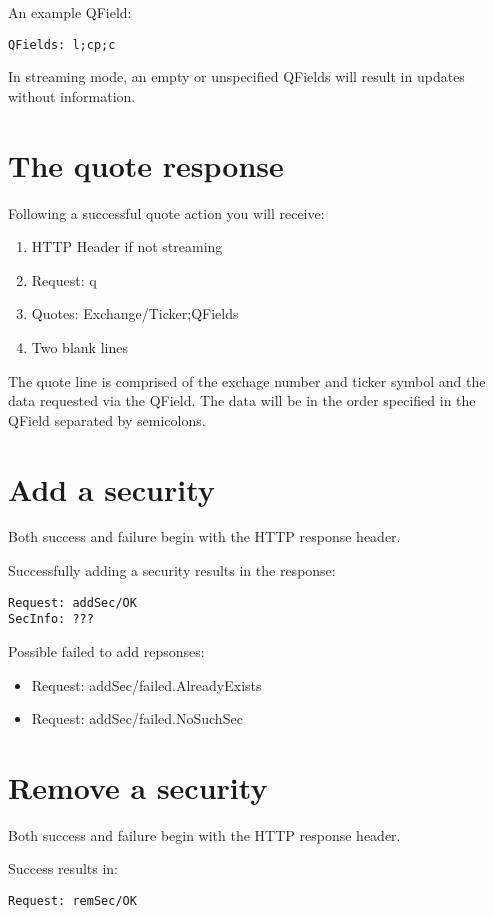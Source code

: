 \documentclass[12pt,twoside,letterpaper]{report}
\begin{document}
An example QField:
\begin{verbatim}
QFields: l;cp;c
\end{verbatim}

In streaming mode, an empty or unspecified QFields will result in updates without information.

\section*{The quote response}
Following a successful quote action you will receive:

\begin{enumerate}
\item HTTP Header if not streaming
\item Request: q
\item Quotes: Exchange/Ticker;QFields
\item Two blank lines
\end{enumerate}

The quote line is comprised of the exchage number and ticker symbol and the data requested via the QField. The data will be in the order specified in the QField separated by semicolons.

\section*{Add a security}
Both success and failure begin with the HTTP response header.

Successfully adding a security results in the response: 
\begin{verbatim}
Request: addSec/OK
SecInfo: ???
\end{verbatim}

Possible failed to add repsonses:
\begin{itemize}
\item Request: addSec/failed.AlreadyExists
\item Request: addSec/failed.NoSuchSec
\end{itemize}

\section*{Remove a security}
Both success and failure begin with the HTTP response header.

Success results in:
\begin{verbatim}
Request: remSec/OK
\end{verbatim}
\end{document}
